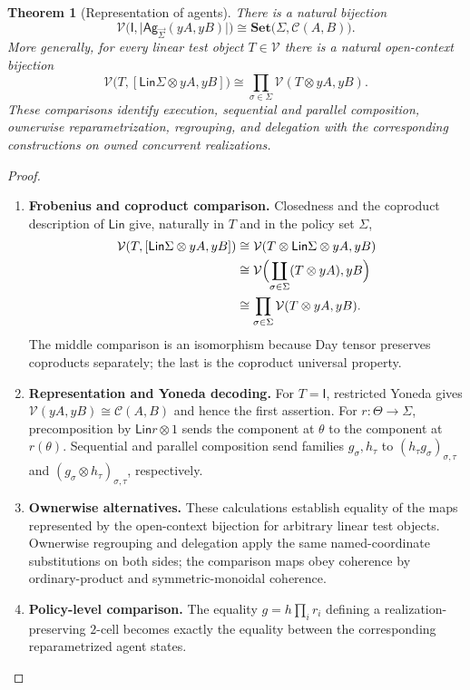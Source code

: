 \documentclass[11pt,a4paper]{article}
\numberwithin{equation}{section}
\newtheorem{theorem}{Theorem}[section]
\theoremstyle{definition}
\theoremstyle{remark}
\theoremstyle{plain}
\providecommand{\Ag}{\mathsf{Ag}}
\providecommand{\sig}{\vec{\Sigma}}
\providecommand{\Lin}{\mathsf{Lin}}
\providecommand{\I}{\mathsf{I}}
\providecommand{\cC}{\mathcal{C}}
\providecommand{\cV}{\mathcal{V}}
\providecommand{\Set}{\mathbf{Set}}
\begin{document}
\begin{theorem}[Representation of agents]
\label{agt-thm-representation}
There is a natural bijection
\[
  \cV\bigl(\I,\bigl|\Ag_{\sig}(yA,yB)\bigr|\bigr)
  \cong\Set\bigl(\Sigma,\cC(A,B)\bigr).
\]
More generally, for every linear test object $T\in\cV$ there is a
natural open-context bijection
\begin{equation}
\label{agt-eq-agent-open-context-representation}
 \cV\bigl(T,[\Lin\Sigma\otimes yA,yB]\bigr)
 \cong\prod_{\sigma\in\Sigma}\cV(T\otimes yA,yB).
\end{equation}
These comparisons identify execution, sequential and parallel composition,
ownerwise reparametrization, regrouping, and delegation with the
corresponding constructions on owned concurrent realizations.
\end{theorem}
\begin{proof}
\leavevmode
\begin{enumerate}[label=\textup{(\arabic*)},leftmargin=*,itemsep=4pt,topsep=3pt]
  \item \textbf{Frobenius and coproduct comparison.} Closedness and the coproduct description of $\Lin$ give, naturally in
$T$ and in the policy set $\Sigma$,
\begin{align*}
 \cV(T,[\Lin\Sigma\otimes yA,yB])
 &\cong\cV(T\otimes\Lin\Sigma\otimes yA,yB)\\
 &\cong\cV\Bigl(\coprod_{\sigma\in\Sigma}(T\otimes yA),yB\Bigr)\\
 &\cong\prod_{\sigma\in\Sigma}\cV(T\otimes yA,yB).
\end{align*}
The middle comparison is an isomorphism because Day tensor preserves
coproducts separately; the last is the coproduct universal property.
  \item \textbf{Representation and Yoneda decoding.} For $T=\I$, restricted Yoneda gives
$\cV(yA,yB)\cong\cC(A,B)$ and hence the first assertion. For $r:\Theta\to\Sigma$, precomposition by $\Lin r\otimes1$
sends the component at $\theta$ to the component at $r(\theta)$. Sequential and parallel composition send families $g_\sigma,h_\tau$
to $(h_\tau g_\sigma)_{\sigma,\tau}$ and
$(g_\sigma\otimes h_\tau)_{\sigma,\tau}$, respectively.
  \item \textbf{Ownerwise alternatives.} These calculations establish equality of the maps represented by the open-context bijection for arbitrary linear test objects. Ownerwise regrouping and delegation apply the same named-coordinate
substitutions on both sides; the comparison maps obey coherence by
ordinary-product and symmetric-monoidal coherence.
  \item \textbf{Policy-level comparison.} The equality
$g=h\prod_i r_i$ defining a realization-preserving $2$-cell becomes
exactly the equality between the corresponding reparametrized
agent states.
\end{enumerate}
\end{proof}
\end{document}
